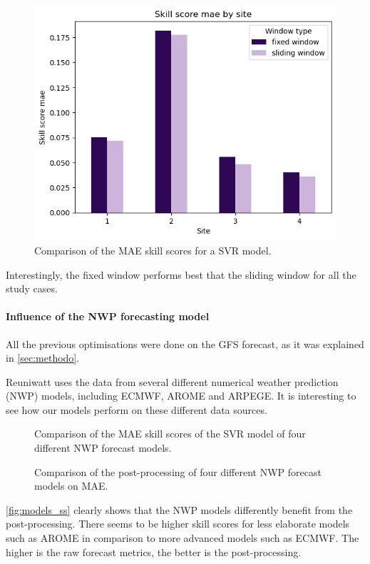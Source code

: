 \begin{figure}[htb!]
    \centering
    \includegraphics[width=0.72\columnwidth]{figures/first_study/comp_window_mae_svr.png}
\caption{Comparison of the MAE skill scores for a SVR model.}
\end{figure}

Interestingly, the fixed window performs best that the sliding window for all the study cases. 

\paragraph{Influence of the NWP forecasting model}
\indent

All the previous optimisations were done on the GFS forecast, as it was explained in \autoref{sec:methodo}.

Reuniwatt uses the data from several different numerical weather prediction (NWP) models, including ECMWF, AROME and ARPEGE.
It is interesting to see how our models perform on these different data sources.
\begin{figure}[htb!]
    \centering
    
    \caption{Comparison of the MAE skill scores of the SVR model of four different NWP forecast models.}
    \label{fig:models_ss}   
\end{figure}
\newpage
\begin{figure}[htb!]
    \centering
    
\caption{Comparison of the post-processing of four different NWP forecast models on MAE.}
\label{fig:models_plot}
\end{figure}

\autoref{fig:models_ss} clearly shows that the NWP models differently benefit from the post-processing.
There seems to be higher skill scores for less elaborate models such as AROME in comparison to more advanced models such as ECMWF. The higher is the raw forecast metrics, the better is the post-processing.

